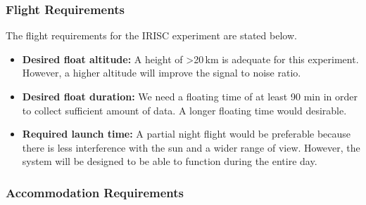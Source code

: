 \subsubsection{Flight Requirements}
The flight requirements for the IRISC experiment are stated below.
\begin{itemize}
	\item \textbf{Desired float altitude:} A height of >20\,km is adequate for this experiment. However, a higher altitude will improve the signal to noise ratio.
	\item \textbf{Desired float duration:} We need a floating time of at least 90 min in order to collect sufficient amount of data. A longer floating time would desirable.
	\item \textbf{Required launch time:} A partial night flight would be preferable because there is less interference with the sun and a wider range of view. However, the system will be designed to be able to function during the entire day.
\end{itemize}

\subsubsection{Accommodation Requirements}

